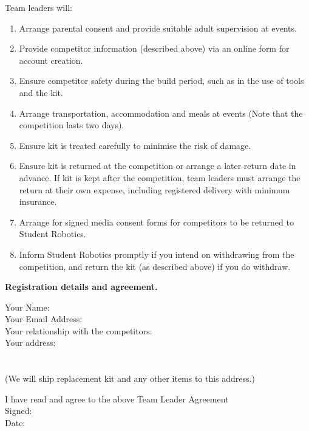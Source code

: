 \documentclass[a4paper, 11pt]{scrartcl}
\begin{document}
Team leaders will:

\begin{enumerate}
\item Arrange parental consent and provide suitable adult supervision at
events.

\item Provide competitor information (described above) via an online form for
account creation.

\item Ensure competitor safety during the build period, such as in the use of
tools and the kit.

\item Arrange transportation, accommodation and meals at events (Note that
the competition lasts two days).

\item Ensure kit is treated carefully to minimise the risk of damage.

\item Ensure kit is returned at the competition or arrange a later return
date in advance.  If kit is kept after the competition, team leaders must
arrange the return at their own expense, including registered delivery with
minimum  insurance.

\item Arrange for signed media consent forms for competitors to be returned
to Student Robotics.

\item Inform Student Robotics promptly if you intend on withdrawing from the
competition, and return the kit (as described above) if you do withdraw.

\end{enumerate}

\textbf{Registration details and agreement.}

\vspace{20pt}
\doublespacing
\noindent
Your Name:\hrulefill\\
Your Email Address:\hrulefill\\
Your relationship with the competitors:\hrulefill\\
Your address:\hrulefill\\
\hbox{}\hrulefill\\
\hbox{}\hrulefill\\
(We will ship replacement kit and any other items to this address.)

\noindent
\dotfill\hfill

\noindent
I have read and agree to the above Team Leader Agreement\\
Signed:\hrulefill\\
Date:\hrulefill\\

\singlespacing
\end{document}
